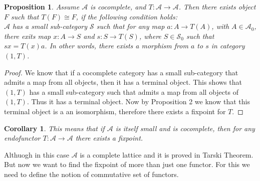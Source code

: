 \documentclass[12pt]{article}
\newcounter{the}
\newtheorem{proposition}[the]{Proposition}
\newtheorem{corollary}[the]{Corollary}
\begin{document}
\begin{proposition}
    Assume $\mathscr A$ is cocomplete, and $ T: \mathscr A \to \mathscr A$. Then there exists object $F$ such that $ T(F) \cong F$, if the following condition holds: \\
    $\mathscr A$ has a small sub-category $\mathscr S$ such that for any map $a: A \to  T(A)$, with $A \in \mathscr A_0$, there exits map $x: A \to S$ and $s: S \to T(S)$, where $S \in \mathscr S_0$ such that $sx =  T(x) a$. In other words, there exists a morphism from $a$ to $s$ in category $(1,  T)$.
\end{proposition}
\begin{proof}
    We know that if a cocomplete category has a small sub-category that admits a map from all objects, then it has a terminal object. This shows that $(1,  T)$ has a small sub-category such that admits a map from all objects of $(1,  T)$. Thus it has a terminal object. Now by Proposition 2 we know that this terminal object is a an isomorphism, therefore there exists a fixpoint for $ T$.
\end{proof}

\begin{corollary}
    This means that if $\mathscr A$ is itself small and is cocomplete, then for any endofunctor $ T: \mathscr A \to \mathscr A$ there exists a fixpoint.
\end{corollary}

Althuogh in this case $\mathscr A$ is a complete lattice and it is proved in Tarski Theorem. But now we want to find the fixpoint of more than just one functor. For this we need to define the notion of commutative set of functors.
\end{document}
